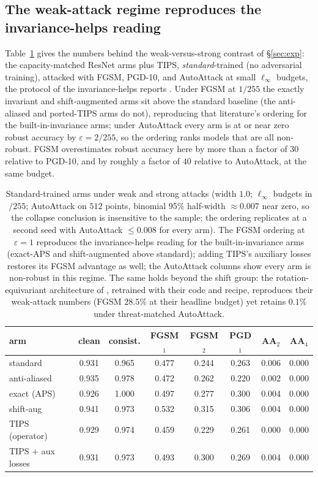 \documentclass{article}
\theoremstyle{definition}
\begin{document}
\subsection{The weak-attack regime reproduces the invariance-helps reading}\label{app:weakattack}
Table~\ref{tab:weakattack} gives the numbers behind the weak-versus-strong contrast of \S\ref{sec:exp}: the capacity-matched ResNet arms plus TIPS, \emph{standard}-trained (no adversarial training), attacked with FGSM, PGD-10, and AutoAttack at small $\ell_\infty$ budgets, the protocol of the invariance-helps reports \citep{saha2024improving,wang2025bridging}. Under FGSM at $1/255$ the exactly invariant and shift-augmented arms sit above the standard baseline (the anti-aliased and ported-TIPS arms do not), reproducing that literature's ordering for the built-in-invariance arms; under AutoAttack every arm is at or near zero robust accuracy by $\varepsilon=2/255$, so the ordering ranks models that are all non-robust. FGSM overestimates robust accuracy here by more than a factor of $30$ relative to PGD-10, and by roughly a factor of $40$ relative to AutoAttack, at the same budget.

\begin{table}[h]\centering
\caption{Standard-trained arms under weak and strong attacks (width $1.0$; $\ell_\infty$ budgets in $/255$; AutoAttack on $512$ points, binomial $95\%$ half-width $\approx0.007$ near zero, so the collapse conclusion is insensitive to the sample; the ordering replicates at a second seed with AutoAttack $\le0.008$ for every arm). The FGSM ordering at $\varepsilon{=}1$ reproduces the invariance-helps reading for the built-in-invariance arms (exact-APS and shift-augmented above standard); adding TIPS's auxiliary losses restores its FGSM advantage as well; the AutoAttack columns show every arm is non-robust in this regime. The same holds beyond the shift group: the rotation-equivariant architecture of \citet{wang2025bridging}, retrained with their code and recipe, reproduces their weak-attack numbers (FGSM $28.5\%$ at their headline budget) yet retains $0.1\%$ under threat-matched AutoAttack.}
\label{tab:weakattack}
\footnotesize
\begin{tabular}{lcc ccc cc}
\toprule
arm & clean & consist. & FGSM$_1$ & FGSM$_2$ & PGD$_1$ & AA$_2$ & AA$_4$ \\
\midrule
standard      & 0.931 & 0.965 & 0.477 & 0.244 & 0.263 & 0.006 & 0.000 \\
anti-aliased  & 0.935 & 0.978 & 0.472 & 0.262 & 0.220 & 0.002 & 0.000 \\
exact (APS)   & 0.926 & 1.000 & 0.497 & 0.277 & 0.300 & 0.004 & 0.000 \\
shift-aug     & 0.941 & 0.973 & 0.532 & 0.315 & 0.306 & 0.004 & 0.000 \\
TIPS (operator) & 0.929 & 0.974 & 0.459 & 0.229 & 0.261 & 0.000 & 0.000 \\
TIPS + aux losses & 0.931 & 0.973 & 0.493 & 0.300 & 0.269 & 0.004 & 0.000 \\
\bottomrule
\end{tabular}
\end{table}
\end{document}
